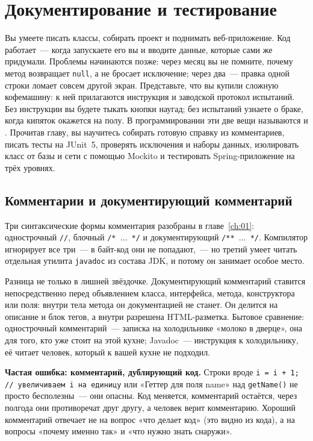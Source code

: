 \chapter{Документирование и тестирование}
\label{ch:10}

Вы умеете писать классы, собирать проект и поднимать веб-приложение. Код работает~--- когда запускаете его вы и вводите данные, которые сами же придумали. Проблемы начинаются позже: через месяц вы не помните, почему метод возвращает \texttt{null}, а не бросает исключение; через два~--- правка одной строки ломает совсем другой экран. Представьте, что вы купили сложную кофемашину: к ней прилагаются инструкция и заводской протокол испытаний. Без инструкции вы будете тыкать кнопки наугад; без испытаний узнаете о браке, когда кипяток окажется на полу. В программировании эти две вещи называются  и . Прочитав главу, вы научитесь собирать готовую справку из комментариев, писать тесты на JUnit~5, проверять исключения и наборы данных, изолировать класс от базы и сети с помощью Mockito и тестировать Spring-приложение на трёх уровнях.

\section{Комментарии и документирующий комментарий}

Три синтаксические формы комментария разобраны в главе~\ref{ch:01}: однострочный \texttt{//}, блочный \texttt{/* $\ldots$ */} и документирующий \texttt{/** $\ldots$ */}. Компилятор игнорирует все три~--- в байт-код они не попадают,~--- но третий умеет читать отдельная утилита \texttt{javadoc} из состава JDK, и потому он занимает особое место.

Разница не только в лишней звёздочке. Документирующий комментарий ставится непосредственно перед объявлением класса, интерфейса, метода, конструктора или поля: внутри тела метода он документацией не станет. Он делится на описание и блок тегов, а внутри разрешена HTML-разметка. Бытовое сравнение: однострочный комментарий~--- записка на холодильнике «молоко в дверце», она для того, кто уже стоит на этой кухне; Javadoc~--- инструкция к холодильнику, её читает человек, который к вашей кухне не подходил.

\begin{oshibka}
\textbf{Частая ошибка: комментарий, дублирующий код.} Строки вроде \texttt{i = i + 1; // увеличиваем i на единицу} или «Геттер для поля name» над \texttt{getName()} не просто бесполезны~--- они опасны. Код меняется, комментарий остаётся, через полгода они противоречат друг другу, а человек верит комментарию. Хороший комментарий отвечает не на вопрос «что делает код» (это видно из кода), а на вопросы «почему именно так» и «что нужно знать снаружи».
\end{oshibka}

